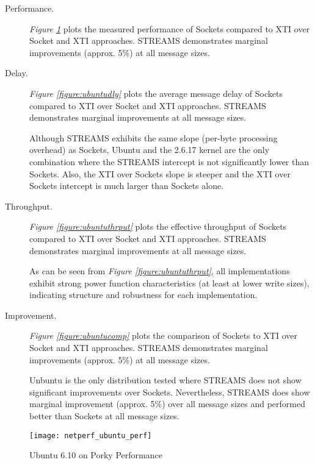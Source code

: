 \documentclass[letterpaper,final,notitlepage,twocolumn,10pt,twoside]{article}
\begin{document}
\begin{description}

\item[Performance.]

\textit{Figure \ref{figure:ubuntuperf}}
plots the measured performance of Sockets compared to XTI over Socket and XTI approaches.  STREAMS
demonstrates marginal improvements (approx. 5\%) at all message sizes.

\item[Delay.]

\textit{Figure \ref{figure:ubuntudly}}
plots the average message delay of Sockets compared to XTI over Socket and XTI approaches.  STREAMS
demonstrates marginal improvements at all message sizes.

Although STREAMS exhibits the same slope (per-byte processing overhead) as Sockets, Ubuntu and the
2.6.17 kernel are the only combination where the STREAMS intercept is not significantly lower than
Sockets.  Also, the XTI over Sockets slope is steeper and the XTI over Sockets intercept is much
larger than Sockets alone.

\item[Throughput.]

\textit{Figure \ref{figure:ubuntuthrput}}
plots the effective throughput of Sockets compared to XTI over Socket and XTI approaches.  STREAMS
demonstrates marginal improvements at all message sizes.

As can be seen from \textit{Figure \ref{figure:ubuntuthrput}}, all implementations exhibit strong
power function characteristics (at least at lower write sizes), indicating structure and robustness
for each implementation.

\item[Improvement.]

\textit{Figure \ref{figure:ubuntucomp}}
plots the comparison of Sockets to XTI over Socket and XTI approaches.  STREAMS demonstrates
marginal improvements (approx. 5\%) at all message sizes.

Unbuntu is the only distribution tested where STREAMS does not show significant improvements over
Sockets.  Nevertheless, STREAMS does show marginal improvement (approx. 5\%) over all message sizes
and performed better than Sockets at all message sizes.

\end{description}

\begin{figure}[p]
\center\texttt{[image: netperf\_ubuntu\_perf]}
\caption[Ubuntu 6.10 on Porky Performance]{Ubuntu 6.10 on Porky Performance}
\label{figure:ubuntuperf}
\end{figure}
\end{document}
